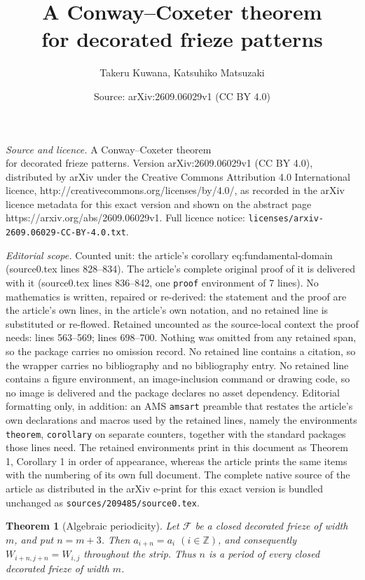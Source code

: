 \documentclass[10pt,a4paper]{amsart}
\title{A Conway--Coxeter theorem \\for decorated frieze patterns}
\author{Takeru Kuwana, Katsuhiko Matsuzaki}
\date{Source: arXiv:2609.06029v1 (CC BY 4.0)}
\newtheorem{theorem}{Theorem}
\newcommand{\Z}{\mathbb Z}
\newcommand{\cF}{\mathcal F}
\begin{document}
\maketitle

\noindent\emph{Source and licence.} A Conway--Coxeter theorem \\for decorated frieze patterns. Version arXiv:2609.06029v1 (CC BY 4.0), distributed by arXiv under the Creative Commons Attribution 4.0 International licence, http://creativecommons.org/licenses/by/4.0/, as recorded in the arXiv licence metadata for this exact version and shown on the abstract page https://arxiv.org/abs/2609.06029v1. Full licence notice: \texttt{licenses/arxiv-2609.06029-CC-BY-4.0.txt}.\par\smallskip

\noindent\textit{Editorial scope.} Counted unit: the article's corollary eq:fundamental-domain (source0.tex lines 828--834). The article's complete original proof of it is delivered with it (source0.tex lines 836--842, one \texttt{proof} environment of 7 lines). No mathematics is written, repaired or re-derived: the statement and the proof are the article's own lines, in the article's own notation, and no retained line is substituted or re-flowed.  Retained uncounted as the source-local context the proof needs: lines 563--569; lines 698--700.  Nothing was omitted from any retained span, so the package carries no omission record.  No retained line contains a citation, so the wrapper carries no bibliography and no bibliography entry.  No retained line contains a figure environment, an image-inclusion command or drawing code, so no image is delivered and the package declares no asset dependency.  Editorial formatting only, in addition: an AMS \texttt{amsart} preamble that restates the article's own declarations and macros used by the retained lines, namely the environments \texttt{theorem}, \texttt{corollary} on separate counters, together with the standard packages those lines need.  The retained environments print in this document as Theorem 1, Corollary 1 in order of appearance, whereas the article prints the same items with the numbering of its own full document.  The complete native source of the article as distributed in the arXiv e-print for this exact version is bundled unchanged as \texttt{sources/209485/source0.tex}.
\begin{theorem}[Algebraic periodicity]\label{thm:periodicity}
Let $\cF$ be a closed decorated frieze of width $m$, and put $n=m+3$. Then
$a_{i+n}=a_i$ $(i\in\Z)$,
and consequently
$W_{i+n,j+n}=W_{i,j}$
throughout the strip. Thus $n$ is a period of every closed decorated frieze of width $m$.
\end{theorem}
\end{document}
